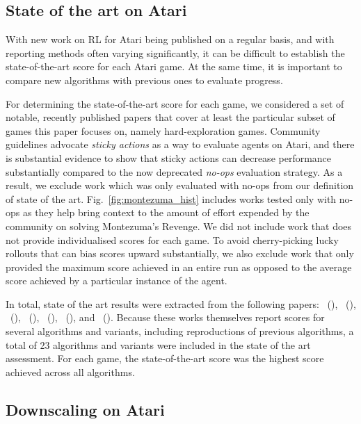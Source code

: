\documentclass{nature}
\renewcommand*{\cite}[1]{\supercite{#1}}
\newcommand{\citefull}[1]{\citeauthor{#1}~(\citeyear{#1})\cite{#1}}
\begin{document}
\begin{methods}

\subsection{State of the art on Atari}
\label{sec:atari_sota}

With new work on RL for Atari being published on a regular basis, and with reporting methods often varying significantly, it can be difficult to establish the state-of-the-art score for each Atari game. At the same time, it is important to compare new algorithms with previous ones to evaluate progress.

For determining the state-of-the-art score for each game, we considered a set of notable, recently published papers that cover at least the particular subset of games this paper focuses on, namely hard-exploration games. Community guidelines advocate \emph{sticky actions} as a way to evaluate agents on Atari\cite{Machado2018RevisitingTA}, and there is substantial evidence to show that sticky actions can decrease performance substantially compared to the now deprecated \emph{no-ops} evaluation strategy\cite{Machado2018RevisitingTA,castro18dopamine,toromanoff2019deep}. As a result, we exclude work which was only evaluated with no-ops from our definition of state of the art. Fig.~\ref{fig:montezuma_hist} includes works tested only with no-ops as they help bring context to the amount of effort expended by the community on solving Montezuma's Revenge. We did not include work that does not provide individualised scores for each game. To avoid cherry-picking lucky rollouts that can bias scores upward substantially, we also exclude work that only provided the maximum score achieved in an entire run as opposed to the average score achieved by a particular instance of the agent. 

In total, state of the art results were extracted from the following papers: \citefull{burda:rnd2018}, \citefull{castro18dopamine}, \citefull{Choi2018ContingencyAwareEI}, \citefull{fedus2019hyperbolic}, \citefull{Taiga2020On}, \citefull{tang2020taylor}, and \citefull{toromanoff2019deep}.
Because these works themselves report scores for several algorithms and variants, including reproductions of previous algorithms, a total of 23 algorithms and variants were included in the state of the art assessment. 
For each game, the state-of-the-art score was the highest score achieved across all algorithms.

\subsection{Downscaling on Atari}


\end{methods}
\end{document}
